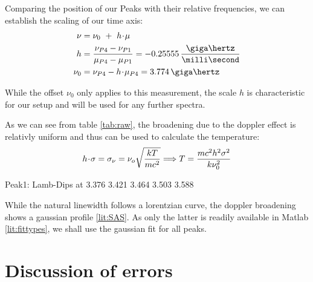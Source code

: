 Comparing the position of our Peaks with their relative frequencies, we can establish the scaling of our time axis:
\begin{align}
	\nu   &= \nu_0 ~+~ h \cdt \mu \\
	 h    &= \frac{\nu_{P4} - \nu_{P1}}{\mu_{P4} - \mu_{P1}} = -0.25555 \,\frac{\giga\hertz}{\milli\second}\\
	\nu_0 &= \nu_{P4} - h \cdt \mu_{P4}  = 3.774 \,\giga\hertz
\end{align}

While the offset $\nu_0$ only applies to this measurement, the scale $h$ is characteristic for our setup and will be used for any further spectra.

As we can see from table \ref{tab:raw}, the broadening due to the doppler effect is relativly uniform and thus can be used to calculate the temperature:
\begin{equation}
 h \!\cdot\! \sigma = \sigma_\nu = \nu_o \sqrt{\frac{k T}{m c^2}} \Longrightarrow T = \frac{m c^2 h^2 \sigma^2}{k\nu_0^2}
\end{equation}








Peak1: Lamb-Dips at
3.376
3.421
3.464
3.503
3.588


While the natural linewidth follows a lorentzian curve, the doppler broadening shows a gaussian profile \ref{lit:SAS}. As only the latter is readily available in Matlab \ref{lit:fittypes}, we shall use the gaussian fit for all peaks.








\section{Discussion of errors}

